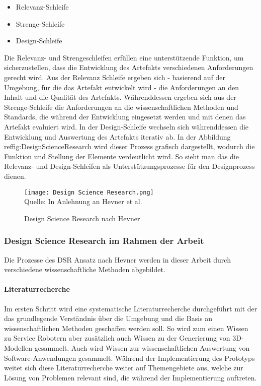 \begin{itemize}
    \item Relevanz-Schleife
    \item Strenge-Schleife
    \item Design-Schleife
\end{itemize}

Die Relevanz- und Strengeschleifen erfüllen eine unterstützende Funktion, um sicherzustellen, dass die Entwicklung des Artefakts verschiedenen Anforderungen gerecht wird. Aus der Relevanz Schleife ergeben sich - basierend auf der Umgebung, für die das Artefakt entwickelt wird - die Anforderungen an den Inhalt und die Qualität des Artefakts. Währenddessen ergeben sich aus der Strenge-Schleife die Anforderungen an die wissenschaftlichen Methoden und Standards, die während der Entwicklung eingesetzt werden und mit denen das Artefakt evaluiert wird. In der Design-Schleife wechseln sich währenddessen die Entwicklung und Auswertung des Artefakts iterativ ab. In der Abbildung ref{fig:DesignScienceResearch} wird dieser Prozess grafisch dargestellt, wodurch die Funktion und Stellung der Elemente verdeutlicht wird. So sieht man das die Relevanz- und Design-Schleifen als Unterstützungsprozesse für den Designprozess dienen.

\begin{figure}[H]
    \caption{Design Science Research nach Hevner}\label{fig:DesignScienceResearch}
    \texttt{[image: Design Science Research.png]}
    \\
    Quelle: In Anlehnung an Hevner et al. \cite[S.~80]{Hevner2004}
\end{figure}

\subsubsection{Design Science Research im Rahmen der Arbeit}

Die Prozesse des \ac{DSR} Ansatz nach Hevner werden in dieser Arbeit durch verschiedene wissenschaftliche Methoden abgebildet.

\paragraph{Literaturrecherche}
Im ersten Schritt wird eine systematische Literaturrecherche durchgeführt mit der das grundlegende Verständnis über die Umgebung und die Basis an wissenschaftlichen Methoden geschaffen werden soll. So wird zum einen Wissen zu Service Robotern aber zusätzlich auch Wissen zu der Generierung von 3D-Modellen gesammelt. Auch wird Wissen zur wissenschaftlichen Auswertung von Software-Anwendungen gesammelt. Während der Implementierung des Prototyps weitet sich diese Literaturrecherche weiter auf Themengebiete aus, welche zur Lösung von Problemen relevant sind, die während der Implementierung auftreten.

